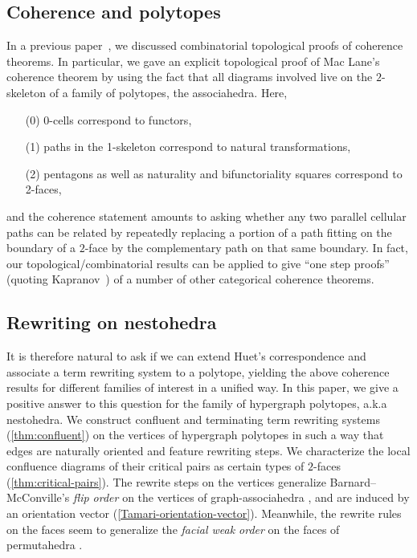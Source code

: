 \subsection*{Coherence and polytopes}

In a previous paper~\cite{CLA1}, we discussed combinatorial topological proofs of coherence theorems.
In particular, we gave an explicit  topological proof of Mac Lane's coherence theorem by using the fact that all diagrams involved live on the $2$-skeleton of a family of polytopes, the associahedra. 
Here, 
\begin{itemize}
\item[(0)] 0-cells correspond to functors, 
\item[(1)] paths in the 1-skeleton correspond to natural transformations,  
\item[(2)]pentagons as well as naturality and bifunctoriality squares correspond to 2-faces,  
\end{itemize}
and the coherence statement amounts to asking whether any two parallel cellular paths can be related by repeatedly replacing a portion of a path fitting on the boundary of a $2$-face by the complementary path on that same boundary.
In fact, our topological/combinatorial results can be applied to give ``one step proofs'' (quoting Kapranov~\cite{kapranov1993}) of a number of other categorical coherence theorems. 

\subsection*{Rewriting on nestohedra}

It is therefore natural to ask if we can extend Huet's correspondence and associate a term rewriting system to a polytope, yielding the above coherence results   for different families of interest in a unified way. 
In this paper, we give a positive answer to this question for the family of hypergraph polytopes, a.k.a nestohedra. 
We construct confluent  and terminating  term rewriting systems (\cref{thm:confluent}) on the vertices of hypergraph polytopes
in such a way that edges are naturally oriented and feature rewriting steps.
We characterize the local confluence diagrams of their critical pairs as certain types of $2$-faces (\cref{thm:critical-pairs}).
The rewrite steps on the vertices generalize Barnard--McConville's \emph{flip order} on the vertices of graph-associahedra \cite{Barnard-McConville}, and are induced by an orientation vector (\cref{Tamari-orientation-vector}).
Meanwhile, the rewrite rules on the faces seem to generalize the \emph{facial weak order} on the faces of permutahedra \cite{KrobLatapyNovelliPhanSchwer,PalaciosRonco,DermenjianHohlwegPilaud}.

